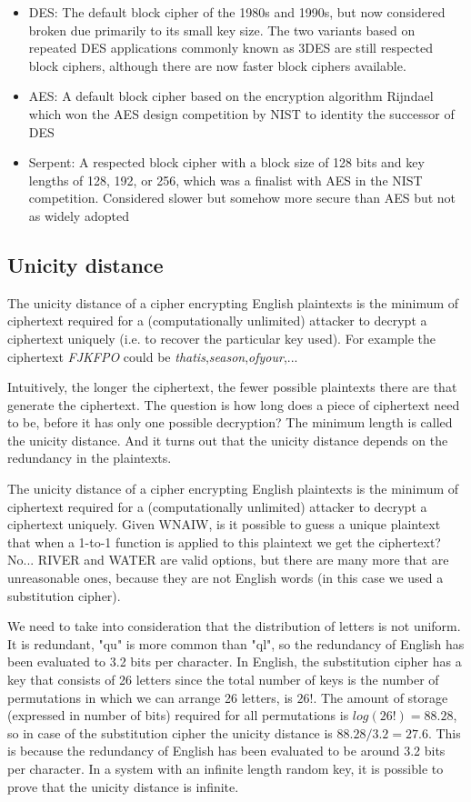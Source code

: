 \begin{itemize}
	\item DES: The default block cipher of the 1980s and 1990s, but now considered broken due primarily to its small key size. The two variants based on repeated DES applications commonly known as 3DES are still respected block ciphers, although there are now faster block ciphers available.
	\item AES: A default block cipher based on the encryption algorithm Rijndael which won the AES design competition by NIST to identity the successor of DES
	\item Serpent: A respected block cipher with a block size of 128 bits and key lengths of 128, 192, or 256, which was a finalist with AES in the NIST competition. Considered slower but somehow more secure than AES but not as widely adopted
\end{itemize}


\subsection{Unicity distance}
The unicity distance of a cipher encrypting English plaintexts is the minimum of ciphertext required for a (computationally unlimited) attacker to decrypt a ciphertext uniquely (i.e. to recover the particular key used). For example the ciphertext \textit{FJKFPO} could be \textit{thatis},\textit{season},\textit{ofyour},...

Intuitively, the longer the ciphertext, the fewer possible plaintexts there are that generate the ciphertext. The question is how long does a piece of ciphertext need to be, before it has only one possible decryption? The minimum length is called the unicity distance. And it turns out that the unicity distance depends on the redundancy in the plaintexts.

The unicity distance of a cipher encrypting English plaintexts is the minimum of ciphertext required for a (computationally unlimited) attacker to decrypt a ciphertext uniquely.
Given WNAIW, is it possible to guess a unique plaintext that when a 1-to-1 function is applied to this plaintext we get the ciphertext? No... RIVER and WATER are valid options, but there are many more that are unreasonable ones, because they are not English words (in this case we used a substitution cipher).

We need to take into consideration that the distribution of letters is not uniform. It is redundant, "qu" is more common than "ql", so the redundancy of English has been evaluated to 3.2 bits per character. In English, the substitution cipher has a key that consists of 26 letters since the total number of keys is the number of permutations in which we can arrange 26 letters, is $26!$. The amount of storage (expressed in number of bits) required for all permutations is $log(26!) = 88.28$, so in case of the substitution cipher the unicity distance is $88.28/3.2 = 27.6$. This is because the redundancy of English has been evaluated to be around 3.2 bits per character. In a system with an infinite length random key, it is possible to prove that the unicity distance is infinite.

